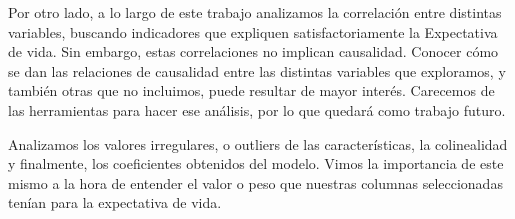 Por otro lado, a lo largo de este trabajo analizamos la correlación entre distintas variables, buscando indicadores que expliquen satisfactoriamente la Expectativa de vida. Sin embargo, estas correlaciones no implican causalidad. Conocer cómo se dan las relaciones de causalidad entre las distintas variables que exploramos, y también otras que no incluimos, puede resultar de mayor interés. Carecemos de las herramientas para hacer ese análisis, por lo que quedará como trabajo futuro.

Analizamos los valores irregulares, o outliers de las características, la colinealidad y finalmente, los coeficientes obtenidos del modelo. Vimos la importancia de este mismo a la hora de entender el valor o peso que nuestras columnas seleccionadas tenían para la expectativa de vida.